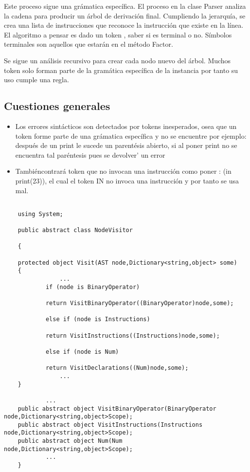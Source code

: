 \documentclass[a4paper,12pt]{article}
\begin{document}
 Este proceso sigue una gr\'amatica espec\'ifica. El proceso en la clase Parser analiza la cadena para producir un \'arbol de derivaci\'on final.
 Cumpliendo la jerarqu\'ia, se crea una lista de instrucciones que reconoce la instrucci\'on que existe en la l\'inea. El algoritmo a pensar es dado un token , saber si es terminal o no. S\'imbolos terminales son aquellos que estar\'an en el m\'etodo Factor.

Se sigue un an\'alisis recursivo para crear cada nodo nuevo del \'arbol. Muchos token solo forman parte de la gram\'atica espec\'ifica de la instancia por tanto su uso cumple una regla.

\subsection*{Cuestiones generales}
\begin{itemize}
    \item Los errores sint\'acticos son detectados por tokens inesperados, osea que un token forme parte de una gr\'amatica espec\'ifica y no se encuentre por ejemplo: despu\'es de un print le sucede un parent\'esis abierto, si al poner print no se encuentra tal par\'entesis pues se devolver\a' un error
    \item Tambi\'encontrar\'a token que no invocan una instrucci\'on como poner : (in print(23)), el cual el token IN no invoca una instrucci\'on y por tanto se usa mal.
\end{itemize}



\begin{lstlisting}

    using System;
    
    public abstract class NodeVisitor 
    
    {
        
    protected object Visit(AST node,Dictionary<string,object> some)
    {
                ...
            if (node is BinaryOperator)
    
            return VisitBinaryOperator((BinaryOperator)node,some);
                
            else if (node is Instructions)
    
            return VisitInstructions((Instructions)node,some);
        
            else if (node is Num)
        
            return VisitDeclarations((Num)node,some);
                ...
    }
    
            ...
    public abstract object VisitBinaryOperator(BinaryOperator node,Dictionary<string,object>Scope);
    public abstract object VisitInstructions(Instructions node,Dictionary<string,object>Scope);
    public abstract object Num(Num node,Dictionary<string,object>Scope);
            ...
    }
    
    \end{lstlisting}
\end{document}
